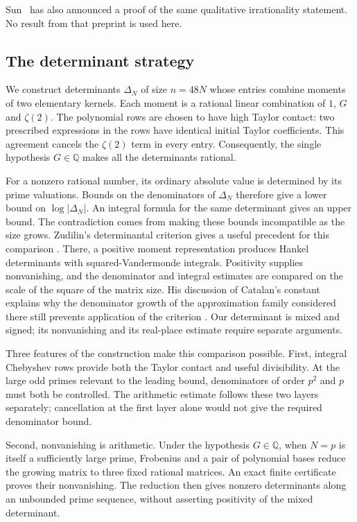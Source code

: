 Sun~\cite[Theorem~1.1]{Sun2026} has also announced a proof of the same
qualitative irrationality statement. No result from that preprint is
used here.

\subsection{The determinant strategy}

We construct determinants $\Delta_N$ of size $n=48N$ whose entries
combine moments of two elementary kernels. Each moment is a rational
linear combination of $1$, $G$ and $\zeta(2)$. The polynomial rows are
chosen to have high Taylor contact: two prescribed expressions in the
rows have identical initial Taylor coefficients. This agreement cancels the $\zeta(2)$ term
in every entry. Consequently, the single hypothesis $G\in\mathbb Q$
makes all the determinants rational.

For a nonzero rational number, its ordinary absolute value is determined
by its prime valuations. Bounds on the denominators of $\Delta_N$
therefore give a lower bound on $\log|\Delta_N|$. An integral formula
for the same determinant gives an upper bound. The contradiction comes
from making these bounds incompatible as the size grows.
Zudilin's determinantal criterion gives a useful precedent for this
comparison \cite[Proposition~2 and Section~2]{Zudilin2017Determinantal}.
There, a positive moment representation produces Hankel determinants
with squared-Vandermonde integrals. Positivity supplies nonvanishing,
and the denominator and integral estimates are compared on the scale
of the square of the matrix size. His discussion of Catalan's constant
explains why the denominator growth of the approximation family
considered there still prevents application of the criterion
\cite[Section~6]{Zudilin2017Determinantal}.
Our determinant is mixed and signed; its nonvanishing and its
real-place estimate require separate arguments.

Three features of the construction make this comparison possible.
First, integral Chebyshev rows provide both the Taylor contact and
useful divisibility. At the large odd primes relevant to the leading
bound, denominators of order $p^2$ and $p$ must both be controlled.
The arithmetic estimate follows these two layers separately; cancellation
at the first layer alone would not give the required denominator bound.

Second, nonvanishing is arithmetic. Under the hypothesis $G\in\mathbb Q$,
when $N=p$ is itself a sufficiently large prime, Frobenius and a pair of
polynomial bases reduce the growing matrix to three fixed rational
matrices. An exact finite certificate proves their nonvanishing.
The reduction then gives nonzero determinants along an unbounded
prime sequence, without asserting positivity of the mixed determinant.

